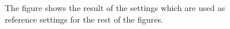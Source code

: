 \begin{figure}[h!]
\centering
{}
\caption
{
\label{fig:fire1}
The figure shows the result of the settings which are used as reference settings for the rest of the figures.
}
\end{figure}

